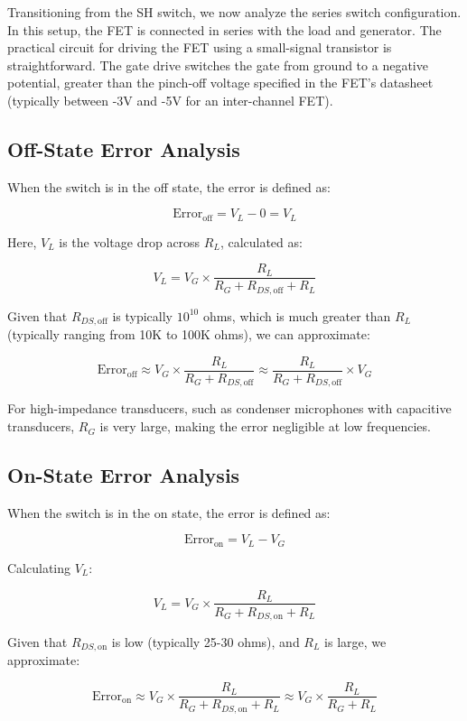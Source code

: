 \documentclass[a4paper,9pt,twoside,openany,twocolumn]{memoir}
\begin{document}
Transitioning from the SH switch, we now analyze the series switch configuration. In this setup, the FET is connected in series with the load and generator. The practical circuit for driving the FET using a small-signal transistor is straightforward. The gate drive switches the gate from ground to a negative potential, greater than the pinch-off voltage specified in the FET's datasheet (typically between -3V and -5V for an inter-channel FET).

\subsection{Off-State Error Analysis}

When the switch is in the off state, the error is defined as:

\[
\text{Error}_{\text{off}} = V_L - 0 = V_L
\]

Here, \( V_L \) is the voltage drop across \( R_L \), calculated as:

\[
V_L = V_G \times \frac{R_L}{R_G + R_{DS,\text{off}} + R_L}
\]

Given that \( R_{DS,\text{off}} \) is typically \( 10^{10} \) ohms, which is much greater than \( R_L \) (typically ranging from 10K to 100K ohms), we can approximate:

\[
\text{Error}_{\text{off}} \approx V_G \times \frac{R_L}{R_G + R_{DS,\text{off}}} \approx \frac{R_L}{R_G + R_{DS,\text{off}}} \times V_G
\]

For high-impedance transducers, such as condenser microphones with capacitive transducers, \( R_G \) is very large, making the error negligible at low frequencies.

\subsection{On-State Error Analysis}

When the switch is in the on state, the error is defined as:

\[
\text{Error}_{\text{on}} = V_L - V_G
\]

Calculating \( V_L \):

\[
V_L = V_G \times \frac{R_L}{R_G + R_{DS,\text{on}} + R_L}
\]

Given that \( R_{DS,\text{on}} \) is low (typically 25-30 ohms), and \( R_L \) is large, we approximate:

\[
\text{Error}_{\text{on}} \approx V_G \times \frac{R_L}{R_G + R_{DS,\text{on}} + R_L} \approx V_G \times \frac{R_L}{R_G + R_L}
\]
\end{document}
